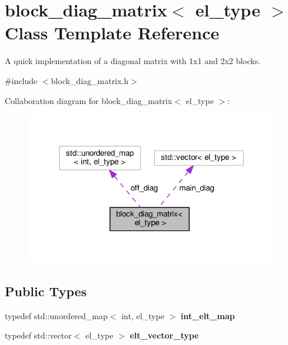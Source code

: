 \hypertarget{classblock__diag__matrix}{}\section{block\+\_\+diag\+\_\+matrix$<$ el\+\_\+type $>$ Class Template Reference}
\label{classblock__diag__matrix}


A quick implementation of a diagonal matrix with 1x1 and 2x2 blocks.  




{\ttfamily \#include $<$block\+\_\+diag\+\_\+matrix.\+h$>$}



Collaboration diagram for block\+\_\+diag\+\_\+matrix$<$ el\+\_\+type $>$\+:\nopagebreak
\begin{figure}[H]
\begin{center}
\leavevmode
\includegraphics[width=314pt]{classblock__diag__matrix__coll__graph}
\end{center}
\end{figure}
\subsection*{Public Types}
\begin{DoxyCompactItemize}
\item 
typedef std\+::unordered\+\_\+map$<$ int, el\+\_\+type $>$ {\bfseries int\+\_\+elt\+\_\+map}\hypertarget{classblock__diag__matrix_a83f8d88c5e6d2bdaee582cad484cc793}{}\label{classblock__diag__matrix_a83f8d88c5e6d2bdaee582cad484cc793}

\item 
typedef std\+::vector$<$ el\+\_\+type $>$ {\bfseries elt\+\_\+vector\+\_\+type}\hypertarget{classblock__diag__matrix_ab9eac6089c211c3332e3e3acc2c5dd89}{}\label{classblock__diag__matrix_ab9eac6089c211c3332e3e3acc2c5dd89}

\end{DoxyCompactItemize}
